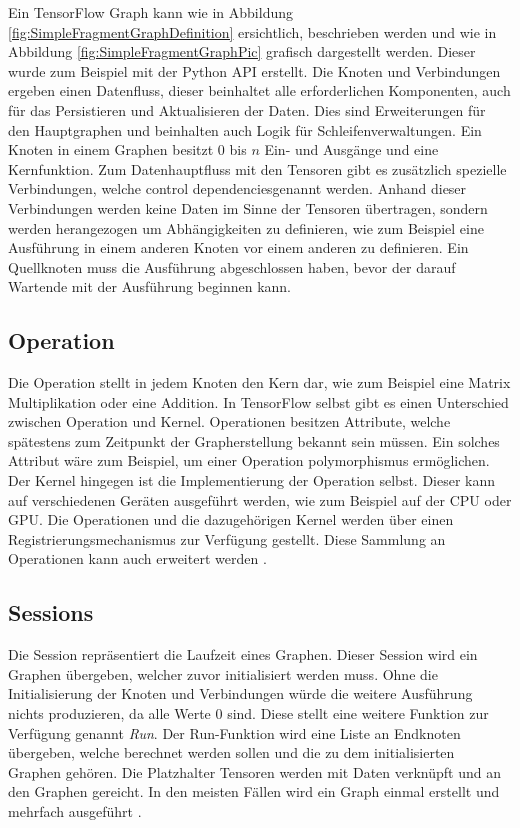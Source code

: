 Ein TensorFlow Graph kann wie in Abbildung \ref{fig:SimpleFragmentGraphDefinition} ersichtlich, beschrieben werden und wie in Abbildung \ref{fig:SimpleFragmentGraphPic} grafisch dargestellt werden.
Dieser wurde zum Beispiel mit der Python API erstellt.
Die Knoten und Verbindungen ergeben einen Datenfluss, dieser beinhaltet alle erforderlichen Komponenten, auch für das Persistieren und Aktualisieren der Daten.
Dies sind Erweiterungen für den Hauptgraphen und beinhalten auch Logik für Schleifenverwaltungen.
Ein Knoten in einem Graphen besitzt $0$ bis $n$ Ein- und Ausgänge und eine Kernfunktion. 
Zum Datenhauptfluss mit den Tensoren gibt es zusätzlich spezielle Verbindungen, welche \glqq control dependencies\grqq genannt werden. 
Anhand dieser Verbindungen werden keine Daten im Sinne der Tensoren übertragen, sondern werden herangezogen um Abhängigkeiten zu definieren, wie zum Beispiel eine Ausführung in einem anderen Knoten vor einem anderen zu definieren.
Ein Quellknoten muss die Ausführung abgeschlossen haben, bevor der darauf Wartende mit der Ausführung beginnen kann. \cite{wp2015tensorflow}

\subsection{Operation}

Die Operation stellt in jedem Knoten den Kern dar, wie zum Beispiel eine Matrix Multiplikation oder eine Addition.
In TensorFlow selbst gibt es einen Unterschied zwischen Operation und Kernel.
Operationen besitzen Attribute, welche spätestens zum Zeitpunkt der Grapherstellung bekannt sein müssen. 
Ein solches Attribut wäre zum Beispiel, um einer Operation polymorphismus ermöglichen.  
Der Kernel hingegen ist die Implementierung der Operation selbst. 
Dieser kann auf verschiedenen Geräten ausgeführt werden, wie zum Beispiel auf der CPU oder GPU.
Die Operationen und die dazugehörigen Kernel werden über einen Registrierungsmechanismus zur Verfügung gestellt. 
Diese Sammlung an Operationen kann auch erweitert werden \cite{wp2015tensorflow}. 

\subsection{Sessions}

Die Session repräsentiert die Laufzeit eines Graphen. 
Dieser Session wird ein Graphen übergeben, welcher zuvor initialisiert werden muss. 
Ohne die Initialisierung der Knoten und Verbindungen würde die weitere Ausführung nichts produzieren, da alle Werte $0$ sind. 
Diese stellt eine weitere Funktion zur Verfügung genannt \textit{Run}. 
Der Run-Funktion wird eine Liste an Endknoten übergeben, welche berechnet werden sollen und die zu dem initialisierten Graphen gehören. 
Die Platzhalter Tensoren werden mit Daten verknüpft und an den Graphen gereicht. 
In den meisten Fällen wird ein Graph einmal erstellt und mehrfach ausgeführt \cite{wp2015tensorflow}. 

